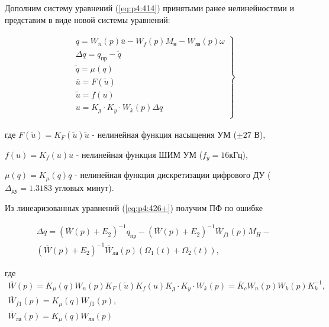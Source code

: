 Дополним систему уравнений (\ref{eq:p4:414}) принятыми ранее нелинейностями и представим в виде новой системы уравнений:

\begin{equation}%
\label{eq:p4:426+}
\begin{alignedat}{2}
\left. \begin{array}{ll}
q = W_n(p) \overline u - W_f(p) M_{\textit{н}} - W_{\textit{ла}} (p)\omega\\
\Delta  q = q_{\textit{пр}}- \widetilde q\\
\widetilde q = \mu (  q  ) \\
\overline u = F ( \widetilde u)\\
\widetilde u = f (u)\\
u = K_{\textit{д}}\cdot K_{y} \cdot W_{k} \left( p \right)  \Delta  q \\
\end{array}  \right\rbrace  
\end{alignedat}
\end{equation}

где 
$F(\widetilde{u})=K_F(\widetilde{u})\widetilde{u}$ - нелинейная функция насыщения УМ ($\pm 27$ В),

$f(u)=K_f(u)u$ - нелинейная функция ШИМ УМ ($f_{\textit{y}} = 16 \textit{кГц}$),

$\mu(q)=K_\mu(q)q$ - нелинейная функция дискретизации цифрового ДУ ($\Delta_{\textit{ду}} = 1.3183$ угловых минут).

Из линеаризованных уравнений (\ref{eq:p4:426+}) получим ПФ по ошибке

\begin{equation}%
\label{eq:p4:427-}
\begin{alignedat}{2}
\Delta  q = 
(\overline W(p)+E_2)^{-1} q _{\textit{пр}}-
(\overline W(p)+E_2)^{-1} \overline W_{f1} \left( p \right) M_{H}-\\
(\overline W(p)+E_2)^{-1} \overline W_{\textit{ла}} (p) (\Omega_{1}(t) + \Omega_{2}(t)),
\end{alignedat}
\end{equation}

где
\begin{equation}
\label{eq:p4:427-+}
\begin{array}{ll}
\overline W (p) = K_\mu(q) W_n(p) K_F(\widetilde{u}) K_f(u) K_{\textit{д}}\cdot K_{y} \cdot W_{k} \left( p \right) = \overline K_c W_n(p) W_{k} ( p ) K_k^{-1},\\
\overline W_{f1} (p) = K_\mu(q) W_{f1} (p),\\ 
\overline W_{\textit{ла}} (p) = K_\mu(q) W_{\textit{ла}} (p)
\end{array}
\end{equation}

